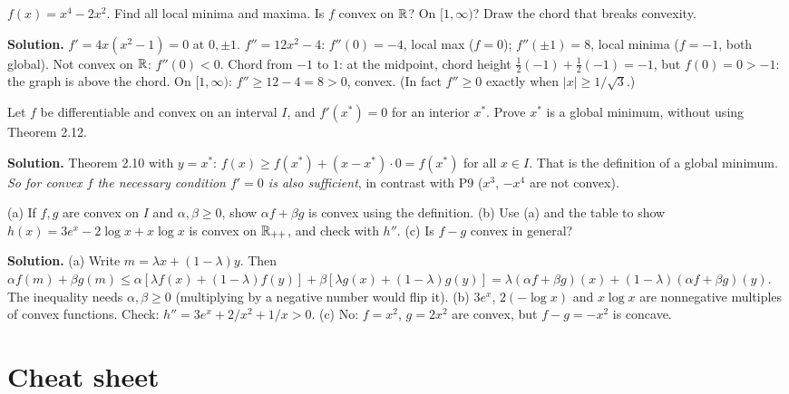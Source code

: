 \begin{example}
$f(x)=x^4-2x^2$. Find all local minima and maxima. Is $f$ convex on $\mathbb{R}$? On $[1,\infty)$? Draw the chord that breaks convexity.

\textbf{Solution.} $f'=4x(x^2-1)=0$ at $0,\pm1$. $f''=12x^2-4$: $f''(0)=-4$, local max ($f=0$); $f''(\pm1)=8$, local minima ($f=-1$, both global).
Not convex on $\mathbb{R}$: $f''(0)<0$. Chord from $-1$ to $1$: at the midpoint, chord height $\tfrac12(-1)+\tfrac12(-1)=-1$, but $f(0)=0>-1$: the graph is above the chord.
On $[1,\infty)$: $f''\ge12-4=8>0$, convex. (In fact $f''\ge0$ exactly when $|x|\ge1/\sqrt3$.)
\end{example}

\begin{example}
Let $f$ be differentiable and convex on an interval $I$, and $f'(x^*)=0$ for an interior $x^*$. Prove $x^*$ is a global minimum, without using Theorem 2.12.

\textbf{Solution.} Theorem 2.10 with $y=x^*$: $f(x)\ge f(x^*)+(x-x^*)\cdot0=f(x^*)$ for all $x\in I$. That is the definition of a global minimum.
\emph{So for convex $f$ the necessary condition $f'=0$ is also sufficient}, in contrast with P9 ($x^3$, $-x^4$ are not convex).
\end{example}

\begin{example}
(a) If $f,g$ are convex on $I$ and $\alpha,\beta\ge0$, show $\alpha f+\beta g$ is convex using the definition.
(b) Use (a) and the table to show $h(x)=3e^x-2\log x+x\log x$ is convex on $\mathbb{R}_{++}$, and check with $h''$.
(c) Is $f-g$ convex in general?

\textbf{Solution.} (a) Write $m=\lambda x+(1-\lambda)y$. Then
$\alpha f(m)+\beta g(m)\le\alpha[\lambda f(x)+(1-\lambda)f(y)]+\beta[\lambda g(x)+(1-\lambda)g(y)] = \lambda(\alpha f+\beta g)(x)+(1-\lambda)(\alpha f+\beta g)(y)$.
The inequality needs $\alpha,\beta\ge0$ (multiplying by a negative number would flip it).
(b) $3e^x$, $2(-\log x)$ and $x\log x$ are nonnegative multiples of convex functions. Check: $h''=3e^x+2/x^2+1/x>0$. \checkmark
(c) No: $f=x^2$, $g=2x^2$ are convex, but $f-g=-x^2$ is concave.
\end{example}

\section{Cheat sheet}

